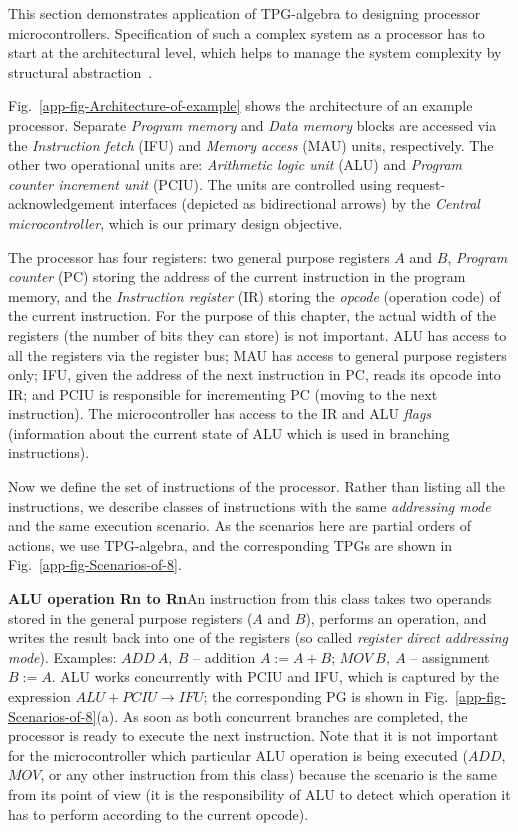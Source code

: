 

This section demonstrates application of TPG-algebra to designing
processor microcontrollers. Specification of such a complex system
as a processor has to start at the architectural level, which helps
to manage the system complexity by structural abstraction~\cite{1994_de_micheli_book}.

Fig.~\ref{app-fig-Architecture-of-example} shows the architecture
of an example processor. Separate \emph{Program memory} and \emph{Data
memory} blocks are accessed via the \emph{Instruction fetch} (IFU)
and \emph{Memory access} (MAU) units, respectively. The other two
operational units are: \emph{Arithmetic logic unit} (ALU) and \emph{Program
counter increment unit} (PCIU). The units are controlled using request-acknowledgement
interfaces (depicted as bidirectional arrows) by the\textbf{\emph{
}}\emph{Central microcontroller}, which is our primary design objective. 

The processor has four registers: two general purpose registers $A$
and $B$, \emph{Program counter} (PC) storing the address of the current
instruction in the program memory, and the \emph{Instruction register}
(IR) storing the \emph{opcode} (operation code) of the current instruction.
For the purpose of this chapter, the actual width of the registers (the
number of bits they can store) is not important. ALU has access to
all the registers via the register bus; MAU has access to general
purpose registers only; IFU, given the address of the next instruction
in PC, reads its opcode into IR; and PCIU is responsible for incrementing
PC (moving to the next instruction). The microcontroller has access
to the IR and ALU \emph{flags} (information about the current state
of ALU which is used in branching instructions).

Now we define the set of instructions of the processor. Rather than
listing all the instructions, we describe classes of instructions
with the same \emph{addressing mode}~\cite{mspmanual} and the same
execution scenario. As the scenarios here are partial orders of actions,
we use TPG-algebra, and the corresponding TPGs are shown in Fig.~\ref{app-fig-Scenarios-of-8}.

\textbf{ALU operation Rn to Rn}\quad{}An instruction from this class
takes two operands stored in the general purpose registers ($A$ and
$B$), performs an operation, and writes the result back into one
of the registers (so called \emph{register direct addressing mode}).
Examples: $\mathit{ADD\ A,\ B}$ -- addition $A:=A+B$; $\mathit{MOV\ B,\ A}$
-- assignment $B:=A$. ALU works concurrently with PCIU and IFU, which
is captured by the expression $\mathit{ALU}+\mathit{PCIU\rightarrow\mathit{IFU}}$;
the corresponding PG is shown in Fig.~\ref{app-fig-Scenarios-of-8}(a).
As soon as both concurrent branches are completed, the processor is
ready to execute the next instruction. Note that it is not important
for the microcontroller which particular ALU operation is being executed
($\mathit{ADD}$, $\mathit{MOV}$, or any other instruction from this
class) because the scenario is the same from its point of view (it
is the responsibility of ALU to detect which operation it has to perform
according to the current opcode). 


